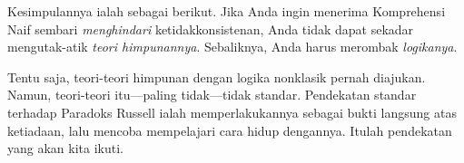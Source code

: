 \documentclass[../../../include/open-logic-section]{subfiles}
\begin{document}
Kesimpulannya ialah sebagai berikut. Jika Anda ingin menerima Komprehensi
Naif sembari \emph{menghindari} ketidakkonsistenan, Anda tidak dapat sekadar
mengutak-atik \emph{teori himpunannya}. Sebaliknya, Anda harus merombak
\emph{logikanya}.

Tentu saja, teori-teori himpunan dengan logika nonklasik pernah diajukan.
Namun, teori-teori itu---paling tidak---tidak standar. Pendekatan standar
terhadap Paradoks Russell ialah memperlakukannya sebagai bukti langsung atas
ketiadaan, lalu mencoba mempelajari cara hidup dengannya. Itulah pendekatan
yang akan kita ikuti.
\end{document}
